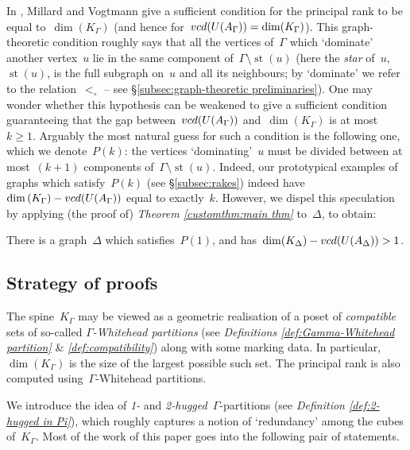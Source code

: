 \documentclass[11pt]{amsart}
\theoremstyle{definition}
\theoremstyle{definition}
\newenvironment{customcor}[1]
  {\renewcommand\theinnercustomcor{#1}\innercustomcor}
  {\endinnercustomcor}
\theoremstyle{definition}
\theoremstyle{definition}
\newcommand{\vcduag}{\textsc{vcd}(U(A_{\Gamma}))} %
\newcommand{\str}[1]{\operatorname{st}({#1})} %
\newcommand{\spine}{K_{\Gamma}} %
\begin{document}
In \cite{MillardVogtmannCubeComplexes21}, Millard and Vogtmann give a sufficient condition for the principal rank to be equal to~$\dim(\spine)$ (and hence for~$\vcduag = \dim(\spine)$). This graph-theoretic condition roughly says that all the vertices of~$\Gamma$ which `dominate' another vertex~$u$ lie in the same component of~$\Gamma \setminus \str{u}$ (here the \emph{star} of~$u$,~$\str{u}$, is the full subgraph on~$u$ and all its neighbours; by `dominate' we refer to the relation~$<_\circ$ -- see \S\ref{subsec:graph-theoretic preliminaries}). One may wonder whether this hypothesis can be weakened to give a sufficient condition guaranteeing that the gap between~$\vcduag$ and~$\dim\left(\spine\right)$ is at most~$k \geq 1$. Arguably the most natural guess for such a condition is the following one, which we denote~$P(k)$: the vertices `dominating'~$u$ must be divided between at most~$(k+1)$ components of~$\Gamma \setminus \str{u}$. Indeed, our prototypical examples of graphs which satisfy~$P(k)$ (see \S\ref{subsec:rakes}) indeed have~$\dim\left(\spine\right) - \vcduag$ equal to exactly~$k$. However, we dispel this speculation by applying (the proof of) \emph{Theorem \ref{customthm:main thm}} to~$\Delta$, to obtain:

\begin{customcor}{C}[\ref{cor:counterexample to suff condition hoped-theorem}]\label{customcor:counterexample}
    There is a graph~$\Delta$ which satisfies~$P(1)$, and has~$\dim(K_\Delta) - \textsc{vcd}(U(A_\Delta)) > 1$.
\end{customcor}

\subsection{Strategy of proofs}\label{subsec:strategy of proof}

The spine~$\spine$ may be viewed as a geometric realisation of a poset of \emph{compatible} sets of so-called \emph{$\Gamma$-Whitehead partitions} (see \textit{Definitions \ref{def:Gamma-Whitehead partition}} \& \textit{\ref{def:compatibility}}) along with some marking data. In particular,~$\dim(\spine)$ is the size of the largest possible such set. The principal rank is also computed using~$\Gamma$-Whitehead partitions.

We introduce the idea of \emph{1-} and \emph{2-hugged}~$\Gamma$-partitions (see \textit{Definition \ref{def:2-hugged in Pi}}), which roughly captures a notion of `redundancy' among the cubes of~$\spine$.  Most of the work of this paper goes into the following pair of statements.
\end{document}
